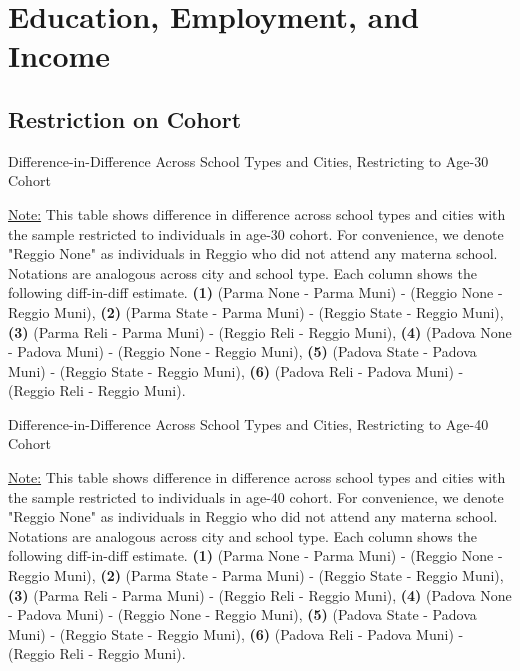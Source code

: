 \documentclass[11pt]{article}
\begin{document}
\section{Education, Employment, and Income}
\subsection{Restriction on Cohort}
\begin{table}[H]
\begin{center}
	\caption{Difference-in-Difference Across School Types and Cities, Restricting to Age-30 Cohort}
	\scalebox{0.80}{
		}
\end{center}
\footnotesize
\underline{Note:} This table shows difference in difference across school types and cities with the sample restricted to individuals in age-30 cohort. For convenience, we denote "Reggio None" as individuals in Reggio who did not attend any materna school. Notations are analogous across city and school type. Each column shows the following diff-in-diff estimate. \textbf{(1)} (Parma None - Parma Muni) - (Reggio None - Reggio Muni), \textbf{(2)} (Parma State - Parma Muni) - (Reggio State - Reggio Muni), \textbf{(3)} (Parma Reli - Parma Muni) - (Reggio Reli - Reggio Muni), \textbf{(4)} (Padova None - Padova Muni) - (Reggio None - Reggio Muni),  \textbf{(5)} (Padova State - Padova Muni) - (Reggio State - Reggio Muni), \textbf{(6)} (Padova Reli - Padova Muni) - (Reggio Reli - Reggio Muni). 
\end{table}

\begin{table}[H]
\begin{center}
	\caption{Difference-in-Difference Across School Types and Cities, Restricting to Age-40 Cohort}
	\scalebox{0.80}{
		}
\end{center}
\footnotesize
\underline{Note:} This table shows difference in difference across school types and cities with the sample restricted to individuals in age-40 cohort. For convenience, we denote "Reggio None" as individuals in Reggio who did not attend any materna school. Notations are analogous across city and school type. Each column shows the following diff-in-diff estimate. \textbf{(1)} (Parma None - Parma Muni) - (Reggio None - Reggio Muni), \textbf{(2)} (Parma State - Parma Muni) - (Reggio State - Reggio Muni), \textbf{(3)} (Parma Reli - Parma Muni) - (Reggio Reli - Reggio Muni), \textbf{(4)} (Padova None - Padova Muni) - (Reggio None - Reggio Muni),  \textbf{(5)} (Padova State - Padova Muni) - (Reggio State - Reggio Muni), \textbf{(6)} (Padova Reli - Padova Muni) - (Reggio Reli - Reggio Muni). 
\end{table}
\end{document}
